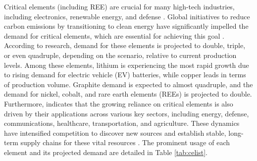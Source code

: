 \documentclass[11pt,a4paper,]{article}
\begin{document}
Critical elements (including REE) are crucial for many high-tech industries, including electronics, renewable energy, and defense \autocite{Huang2018}. Global initiatives to reduce carbon emissions by transitioning to clean energy have significantly impelled the demand for critical elements, which are essential for achieving this goal \autocite{IEA2021,Wang2022}. According to \textcite{IEA2024} research, demand for these elements is projected to double, triple, or even quadruple, depending on the scenario, relative to current production levels. Among these elements, lithium is experiencing the most rapid growth due to rising demand for electric vehicle (EV) batteries, while copper leads in terms of production volume. Graphite demand is expected to almost quadruple, and the demand for nickel, cobalt, and rare earth elements (REEs) is projected to double. Furthermore, \textcite{Fortier2018} indicates that the growing reliance on critical elements is also driven by their applications across various key sectors, including energy, defense, communications, healthcare, transportation, and agriculture. These dynamics have intensified competition to discover new sources and establish stable, long-term supply chains for these vital resources \autocite{Emsbo2021}. The prominent usage of each element and its projected demand are detailed in Table \ref{tab:celist}.

\begingroup\fontsize{9}{11}\selectfont
\end{document}
